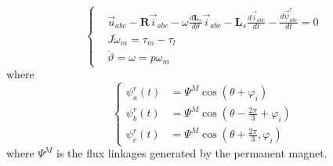 \documentclass[12pt,a4paper,oneside]{book}
\begin{document}
\begin{onehalfspace}
\begin{equation}\label{threephase_eq3}
	\left\lbrace \begin{aligned}
		& 
		\vec{u}_{abc}-\mathbf{R}\vec{i}_{abc}-\omega\frac{d\mathbf{L}_s}{d\theta}\vec{i}_{abc}-\mathbf{L}_s\frac{d\vec{i}_{abc}}{dt}-\frac{d\vec{\psi}^r_{abc}}{dt}
		= 0 \\[6pt]
		& J\dot{\omega}_m = \tau_m-\tau_l \\[6pt]
		& \dot{\vartheta} = \omega =p\omega_m
	\end{aligned} \right. 
\end{equation}
where
\begin{equation}\label{magnet_flux}
	\left\lbrace \begin{aligned}
		\psi_a^r(t) &= \Psi^M\cos(\theta+\varphi_i) \\[6pt]
		\psi_b^r(t) &= \Psi^M\cos(\theta-\frac{2\pi}{3}+ \varphi_i) \\[6pt]
		\psi_c^r(t) &= \Psi^M\cos(\theta+\frac{2\pi}{3}, \varphi_i)
	\end{aligned} \right. 
\end{equation}
where $\Psi^M$ is the flux linkages generated by the permanent magnet.    


\end{onehalfspace}
\end{document}
